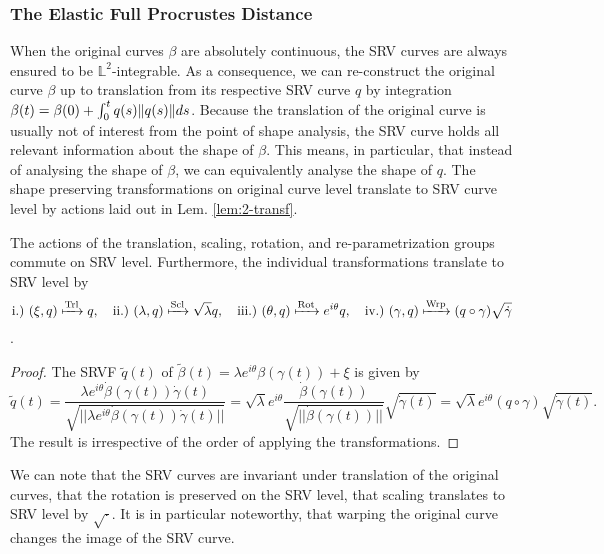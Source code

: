 \subsubsection*{The Elastic Full Procrustes Distance}
When the original curves $\beta$ are absolutely continuous, the SRV curves are always ensured to be $\mathbb{L}^2$-integrable.
As a consequence, we can re-construct the original curve $\beta$ up to translation from its respective SRV curve $q$ by integration $\beta(t) = \beta(0) + \int_0^t q(s) \lVert q(s)\rVert ds$.
Because the translation of the original curve is usually not of interest from the point of shape analysis, the SRV curve holds all relevant information about the shape of $\beta$.
This means, in particular, that instead of analysing the shape of $\beta$, we can equivalently analyse the shape of $q$.
The shape preserving transformations on original curve level translate to SRV curve level by actions laid out in Lem. \ref{lem:2-transf}.

\begin{lemma}
  \label{lem:2-transf}
  The actions of the translation, scaling, rotation, and re-parametrization groups commute on SRV level.
  Furthermore, the individual transformations translate to SRV level by 
  \begin{equation*}
    \text{i.)} \,\,(\xi, q) \xmapsto{\text{Trl}} q,\quad 
    \text{ii.)} \,\, (\lambda, q) \xmapsto{\text{Scl}} \sqrt\lambda q,\quad
    \text{iii.)} \,\, (\theta, q) \xmapsto{\text{Rot}} e^{i\theta} q,\quad
    \text{iv.)} \,\, (\gamma, q) \xmapsto{\text{Wrp}} (q \circ \gamma) \sqrt{\dot\gamma}
  \end{equation*}
  \parencite[see e.g.][142]{SrivastavaKlassen2016}.
\begin{proof} The SRVF $\widetilde q(t)$ of  $\widetilde\beta(t) = \lambda e^{i\theta}\beta\left(\gamma(t)\right) + \xi$ is given by
$$ \widetilde q (t) 
  = \frac{\lambda e^{i\theta} \dot\beta\left(\gamma(t)\right) \dot\gamma(t)}{\sqrt{||\lambda e^{i\theta} \dot\beta\left(\gamma(t)\right) \dot\gamma(t)||}} 
  = \sqrt{\lambda} e^{i\theta} \frac{\dot\beta\left(\gamma(t)\right)}{\sqrt{||\dot\beta\left(\gamma(t)\right)||}} \sqrt{\dot\gamma(t)} 
  = \sqrt\lambda e^{i\theta} \left( q \circ \gamma \right) \sqrt{\dot\gamma(t)}.$$
The result is irrespective of the order of applying the transformations.
\end{proof}
\end{lemma}

\noindent We can note that the SRV curves are invariant under translation of the original curves, that the rotation is preserved on the SRV level, that scaling translates to SRV level by $\sqrt{\cdot}$.
It is in particular noteworthy, that warping the original curve changes the image of the SRV curve.

